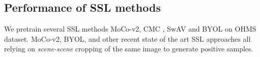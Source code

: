 \subsection{Performance of SSL methods}
\label{sec:sslanalysis}
We pretrain several SSL methods MoCo-v2, CMC \cite{tian2019contrastive}, SwAV  \cite{NEURIPS2020_70feb62b} and BYOL \cite{grill2020bootstrap} on OHMS dataset. 
MoCo-v2, BYOL, and other recent state of the art SSL approaches all relying on \textit{scene-scene} cropping of the same image to generate positive samples. 


